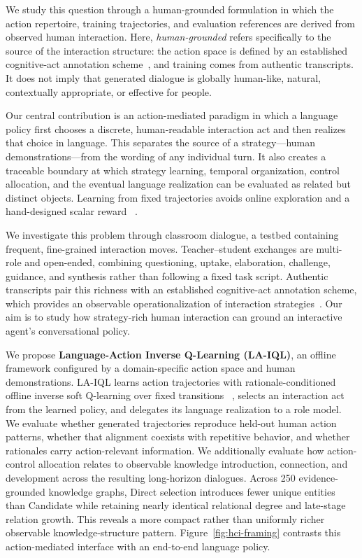 \documentclass[manuscript,review,anonymous]{acmart}
\begin{document}
We study this question through a human-grounded formulation in which the action
repertoire, training trajectories, and evaluation references are derived from
observed human interaction. Here, \emph{human-grounded} refers specifically to
the source of the interaction structure: the action space is defined by an
established cognitive-act annotation scheme~\citep{songyu79}, and training
comes from authentic transcripts. It does not imply that generated dialogue is
globally human-like, natural, contextually appropriate, or effective for
people.

Our central contribution is an action-mediated paradigm in which a language
policy first chooses a discrete, human-readable interaction act and then
realizes that choice in language. This separates the source of a
strategy---human demonstrations---from the wording of any individual turn. It
also creates a traceable boundary at which strategy learning, temporal
organization, control allocation, and the eventual language realization can be
evaluated as related but distinct objects. Learning from fixed trajectories
avoids online exploration and a hand-designed scalar reward
~\citep{li2016deep,ouyang2022training,schulman2017proximal}.

We investigate this problem through classroom dialogue, a testbed containing
frequent, fine-grained interaction moves. Teacher--student exchanges are
multi-role and open-ended, combining questioning, uptake, elaboration,
challenge, guidance, and synthesis rather than following a fixed task script.
Authentic transcripts pair this richness with an established cognitive-act
annotation scheme, which provides an observable operationalization of
interaction strategies~\citep{songyu79}. Our aim is to study how strategy-rich
human interaction can ground an interactive agent's conversational policy.

We propose \textbf{Language-Action Inverse Q-Learning (LA-IQL)}, an offline
framework configured by a domain-specific action space and human
demonstrations. LA-IQL learns action trajectories with rationale-conditioned
offline inverse soft Q-learning over fixed transitions
~\citep{garg2021iqlearn,wulfmeier2024imitating}, selects an interaction act
from the learned policy, and delegates its language realization to a role
model. We evaluate whether generated trajectories reproduce held-out human
action patterns, whether that alignment coexists with repetitive behavior, and
whether rationales carry action-relevant information. We additionally evaluate
how action-control allocation relates to observable knowledge introduction,
connection, and development across the resulting long-horizon dialogues.
Across 250 evidence-grounded knowledge graphs, Direct selection introduces
fewer unique entities than Candidate while retaining nearly identical
relational degree and late-stage relation growth. This reveals a more compact
rather than uniformly richer observable knowledge-structure pattern.
Figure~\ref{fig:hci-framing} contrasts this action-mediated interface with an
end-to-end language policy.
\end{document}
